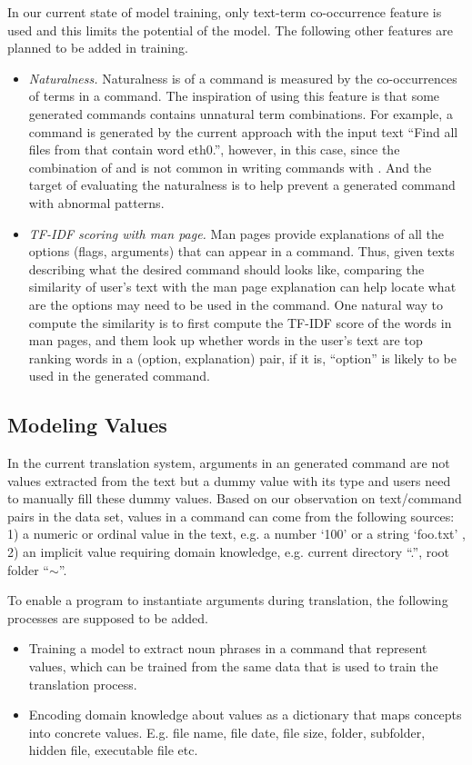 In our current state of model training, only text-term co-occurrence feature is used and this limits the potential of the model. The following other features are planned to be added in training.
\begin{itemize}\itemsep-1pt
\item \textit{Naturalness.} Naturalness is of a command is measured by the co-occurrences of terms in a command. The inspiration of using this feature is that some generated commands contains unnatural term combinations. For example, a command  is generated by the current approach with the input text ``Find all files from that contain word eth0.'', however, in this case, since the combination of  and  is not common in writing commands with . And the target of evaluating the naturalness is to help prevent a generated command with abnormal patterns.
\item \textit{TF-IDF scoring with man page.} Man pages provide explanations of all the options (flags, arguments) that can appear in a command. Thus, given texts describing what the desired command should looks like, comparing the similarity of user's text with the man page explanation can help locate what are the options may need to be used in the command. One natural way to compute the similarity is to first compute the TF-IDF score of the words in man pages, and them look up whether words in the user's text are top ranking words in a (option, explanation) pair, if it is, ``option'' is likely to be used in the generated command.  
\end{itemize} 

\subsection{Modeling Values}
\label{future:semantics}

In the current translation system, arguments in an generated command are not values extracted from the text but a dummy value with its type and users need to manually fill these dummy values. Based on our observation on text/command pairs in the data set, values in a command can come from the following sources: 1) a numeric or ordinal value in the text, e.g. a number `100' or a string `foo.txt' , 2) an implicit value requiring domain knowledge, e.g. current directory ``.'', root folder ``$\sim$''.

To enable a program to instantiate arguments during translation, the following processes are supposed to be added. 
\begin{itemize}\itemsep-1pt
\item Training a model to extract noun phrases in a command that represent values, which can be trained from the same data that is used to train the translation process.
\item Encoding domain knowledge about values as a dictionary that maps concepts into concrete values. E.g. file name, file date, file size, folder, subfolder, hidden file, executable file etc.
\end{itemize}

